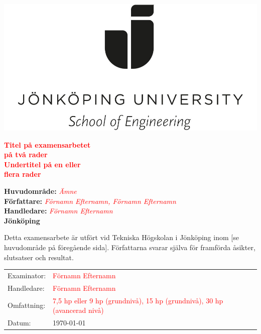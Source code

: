 \documentclass[12pt,a4paper]{article}
\begin{document}
\pagestyle{empty}

\includegraphics[width=7 cm]{Bilder/JU_logga_stor.jpg}
\vfill

\textbf{\Huge \textcolor{red}{Titel på examensarbetet \\ på två rader} }
\\[0.6cm]

\textbf{\large \textcolor{red}{Undertitel på en eller\\flera rader} }
\vfill


\textbf{Huvudområde:} \textit{\textcolor{red}{Ämne} } \\
\textbf{Författare:} \textit{\textcolor{red}{Förnamn Efternamn, Förnamn Efternamn} }\\
\textbf{Handledare:} \textit{\textcolor{red}{Förnamn Efternamn} }\\
\textbf{Jönköping} \the\year{} \monthname


\newpage
\pagestyle{fancy}


\vspace*{\fill}

Detta examensarbete är utfört vid Tekniska Högskolan i Jönköping inom
[se huvudområde på föregående sida].
Författarna svarar själva för framförda åsikter, slutsatser och resultat. \\[0.5em]
\begin{tabular}{@{}ll}
Examinator: & \textcolor{red}{Förnamn Efternamn} \\
Handledare: & \textcolor{red}{Förnamn Efternamn} \\
Omfattning: & \textcolor{red}{7,5 hp eller 9 hp (grundnivå), 15 hp (grundnivå), 30 hp (avancerad nivå)} \\
Datum:      & \today
\end{tabular}

\let\Sectionmark\sectionmark
\def\sectionmark#1{\def\Sectionname{#1}\Sectionmark{#1}}

\renewcommand{\headrulewidth}{0pt}
\renewcommand{\footrulewidth}{0.4pt}
\end{document}
